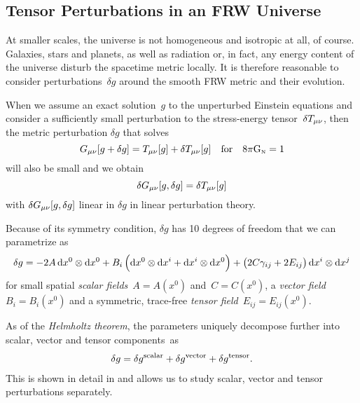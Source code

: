 \documentclass[12pt,parskip=half]{scrreprt}
\newcommand{\todocheck}[1]{\todo[color=blue!40]{#1}}
\begin{document}
\subsection{Tensor Perturbations in an FRW Universe}\label{sec:perturb}

At smaller scales, the universe is not homogeneous and isotropic at all, of course. Galaxies, stars and planets, as well as radiation or, in fact, any energy content of the universe disturb the spacetime metric locally. It is therefore reasonable to consider perturbations~\(\delta g\) around the smooth FRW metric and their evolution.

When we assume an exact solution~\(g\) to the unperturbed Einstein equations and consider a sufficiently small perturbation to the stress-energy tensor~\(\delta T_{\mu \nu}\), then the metric perturbation \(\delta g\) that solves
\begin{equation}
	G_{\mu \nu}[g + \delta g] = T_{\mu \nu}[g] + \delta T_{\mu \nu}[g] \quad \text{for} \quad 8 \pi \mathrm{G}_\textnormal{\tiny{N}} = 1
\end{equation}
will also be small  and we obtain
\begin{equation}\label{eq:perturbed_einstein_eqns}
	\delta G_{\mu \nu}[g,\delta g] = \delta T_{\mu \nu}[g]
\end{equation}
with \(\delta G_{\mu \nu}[g,\delta g]\) linear in \(\delta g\) in linear perturbation theory.

Because of its symmetry condition, \(\delta g\) has 10 degrees of freedom that we can parametrize as \citep{Schulz}
\begin{align}
	\delta g = -2A \dif{x^0}\otimes\dif{x^0} + B_i\del{\dif{x^0}\otimes\dif{x^i}+\dif{x^i}\otimes\dif{x^0}} + \del{2C\gamma_{ij} + 2E_{ij}}\dif{x^i}\otimes\dif{x^j}
\end{align}\todocheck{notation}
for small spatial \emph{scalar fields}~\(A=A(x^0)\) and~\(C=C(x^0)\), a \emph{vector field}~\(B_i=B_i(x^0)\) and a symmetric, trace-free \emph{tensor field}~\(E_{ij}=E_{ij}(x^0)\).

As of the \emph{Helmholtz theorem}, the parameters uniquely decompose further into scalar, vector and tensor components~as
\begin{align}
	\delta g = \delta g^{\mathrm{scalar}} + \delta g^{\mathrm{vector}} + \delta g^{\mathrm{tensor}} \mathpunct{.}
\end{align}
This is shown in detail in  and allows us to study scalar, vector and tensor perturbations separately. 
\end{document}
